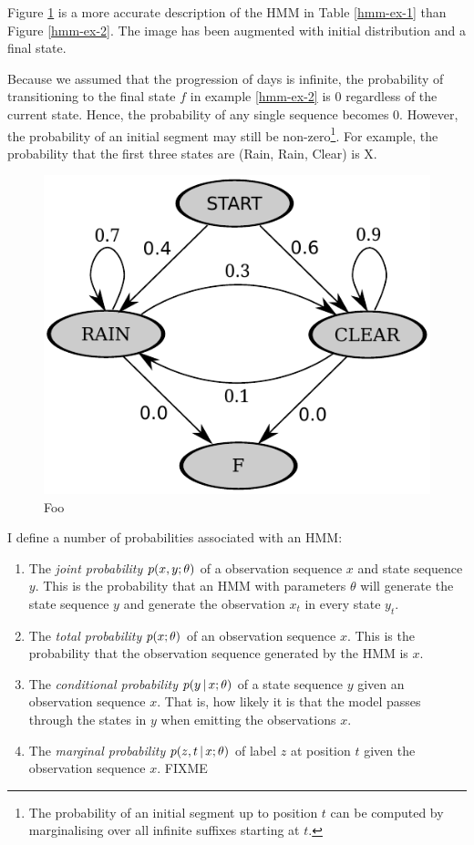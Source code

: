 Figure \ref{hmm-ex-3} is a more accurate description of the HMM in
Table \ref{hmm-ex-1} than Figure \ref{hmm-ex-2}. The image has been
augmented with initial distribution and a final state. 

Because we assumed that the progression of days is infinite, the
probability of transitioning to the final state $f$ in example
\ref{hmm-ex-2} is 0 regardless of the current state. Hence, the
probability of any single sequence becomes 0. However, the probability
of an initial segment may still be non-zero\footnote{The probability
  of an initial segment up to position $t$ can be computed by
  marginalising over all infinite suffixes starting at $t$.}. For
example, the probability that the first three states are (Rain,
Rain, Clear) is X.

\begin{figure}[!htb]
\begin{center}
\caption{Foo}\label{hmm-ex-3}
\includegraphics[scale=0.8]{hmm-ex-graph-2}
\end{center}
\end{figure}

I define a number of probabilities associated with an HMM:
\begin{enumerate}
\item The {\it joint probability} $p(x,y\mbox{$ ; \, $}\theta)$ of a observation
  sequence $x$ and state sequence $y$. This is the probability that an
  HMM with parameters $\theta$ will generate the state sequence $y$
  and generate the observation $x_t$ in every state $y_t$.
\item The {\it total probability} $p(x\mbox{$ ; \, $} \theta)$ of an observation
  sequence $x$. This is the probability that the observation sequence
  generated by the HMM is $x$.
\item The {\it conditional probability} $p(y\mbox{$ \, | \, $} x\mbox{$ ; \, $}\theta)$ of a
  state sequence $y$ given an observation sequence $x$. That is, how
  likely it is that the model passes through the states in $y$ when
  emitting the observations $x$.
\item The {\it marginal probability} $p(z, t\mbox{$ \, | \, $} x\mbox{$ ; \, $} \theta)$ of
  label $z$ at position $t$ given the observation sequence $x$. FIXME
\end{enumerate}

